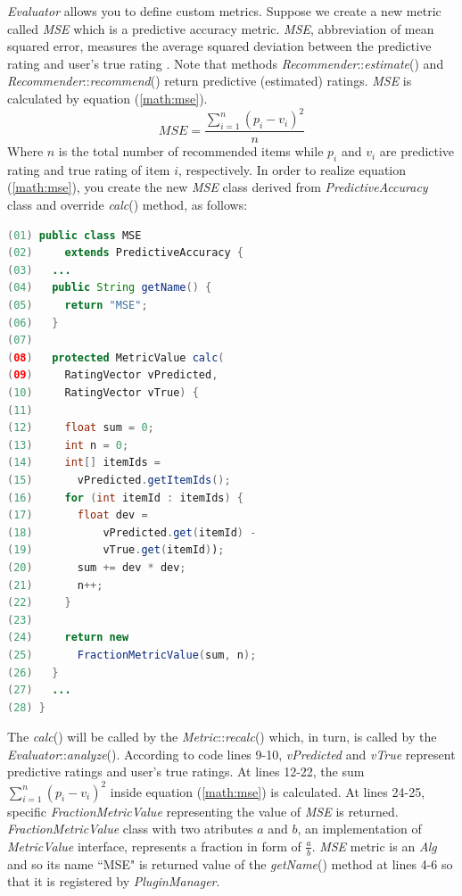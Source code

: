 \documentclass[a4paper,twoside]{article}
\begin{document}
\textit{Evaluator} allows you to define custom metrics. Suppose we create a new metric called \textit{MSE} which is a predictive accuracy metric. \textit{MSE}, abbreviation of mean squared error, measures the average squared deviation between the predictive rating and user's true rating \cite{herlocker2004}. Note that methods \textit{Recommender}::\textit{estimate}() and \textit{Recommender}::\textit{recommend}() return predictive (estimated) ratings. \textit{MSE} is calculated by equation (\ref{math:mse}).
\begin{equation} \label{math:mse}
MSE = \frac{\sum_{i=1}^{n}(p_i-v_i)^2}{n}
\end{equation}
Where $n$ is the total number of recommended items while $p_i$ and $v_i$ are predictive rating and true rating of item $i$, respectively. In order to realize equation (\ref{math:mse}), you create the new \textit{MSE} class derived from \textit{PredictiveAccuracy} class and override \textit{calc}() method, as follows:
\begin{small}
\begin{lstlisting}[language = Java]
(01) public class MSE
(02)     extends PredictiveAccuracy {
(03)   ...
(04)   public String getName() {
(05)     return "MSE";
(06)   }
(07)
(08)   protected MetricValue calc(
(09)     RatingVector vPredicted,
(10)     RatingVector vTrue) {
(11) 
(12)     float sum = 0;
(13)     int n = 0;
(14)     int[] itemIds =
(15)       vPredicted.getItemIds();
(16)     for (int itemId : itemIds) {
(17)       float dev =
(18)           vPredicted.get(itemId) - 
(19)           vTrue.get(itemId));
(20)       sum += dev * dev;
(21)       n++;
(22)     }
(23) 
(24)     return new
(25)       FractionMetricValue(sum, n);
(26)   }
(27)   ...
(28) }
\end{lstlisting}
\end{small}
The \textit{calc}() will be called by the \textit{Metric}::\textit{recalc}() which, in turn, is called by the \textit{Evaluator}::\textit{analyze}(). According to code lines 9-10, \textit{vPredicted} and \textit{vTrue} represent predictive ratings and user's true ratings. At lines 12-22, the sum $\sum_{i=1}^{n}(p_i-v_i)^2$ inside equation (\ref{math:mse}) is calculated. At lines 24-25, specific \textit{FractionMetricValue} representing the value of \textit{MSE} is returned. \textit{FractionMetricValue} class with two atributes $a$ and $b$, an implementation of \textit{MetricValue} interface, represents a fraction in form of $\frac{a}{b}$. \textit{MSE} metric is an \textit{Alg} and so its name ``MSE" is returned value of the \textit{getName}() method at lines 4-6 so that it is registered by \textit{PluginManager}.
\end{document}
